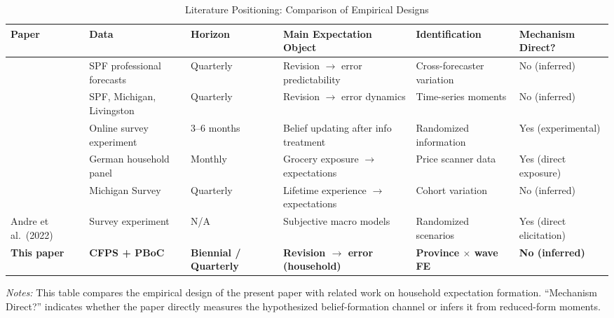 \begin{landscape}
\begin{table}[htbp]
\centering
\begin{threeparttable}
\caption{Literature Positioning: Comparison of Empirical Designs}
\label{tab:literature_comparison}
\small
\begin{tabular}{llllll}
\toprule
Paper & Data & Horizon & Main Expectation Object & Identification & Mechanism Direct? \\
\midrule
\citet{Bordalo2020b} & SPF professional forecasts & Quarterly & Revision $\to$ error predictability & Cross-forecaster variation & No (inferred) \\
\citet{Coibion2015} & SPF, Michigan, Livingston & Quarterly & Revision $\to$ error dynamics & Time-series moments & No (inferred) \\
\citet{Cavallo2017} & Online survey experiment & 3--6 months & Belief updating after info treatment & Randomized information & Yes (experimental) \\
\citet{DacuntoHoangPirolliWeber2021} & German household panel & Monthly & Grocery exposure $\to$ expectations & Price scanner data & Yes (direct exposure) \\
\citet{Malmendier2016} & Michigan Survey & Quarterly & Lifetime experience $\to$ expectations & Cohort variation & No (inferred) \\
Andre et al.\ (2022) & Survey experiment & N/A & Subjective macro models & Randomized scenarios & Yes (direct elicitation) \\
\midrule
\textbf{This paper} & \textbf{CFPS + PBoC} & \textbf{Biennial / Quarterly} & \textbf{Revision $\to$ error (household)} & \textbf{Province $\times$ wave FE} & \textbf{No (inferred)} \\
\bottomrule
\end{tabular}
\begin{tablenotes}[flushleft]
\footnotesize
\item \textit{Notes:} This table compares the empirical design of the present paper with related work on household expectation formation. ``Mechanism Direct?'' indicates whether the paper directly measures the hypothesized belief-formation channel or infers it from reduced-form moments.
\end{tablenotes}
\end{threeparttable}
\end{table}
\end{landscape}
